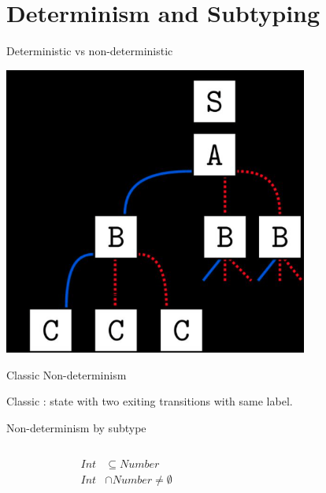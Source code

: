 \section{Determinism and Subtyping}

{  %
\begin{frame}{Deterministic vs non-deterministic}
  \centering
  
  \includegraphics[width=0.75\textwidth]{determ.png} 
\end{frame}
}

\begin{frame}{Classic Non-determinism}
  \centering
  
  \scalebox{0.95}{}

  Classic : state with two exiting transitions with same label.

\end{frame}

\begin{frame}{Non-determinism by subtype}
  \begin{columns}[T]
    \begin{column}{0.35\textwidth}
      \centering
      
      \begin{align*}
        Int&\subseteq Number\\
        Int &\cap Number \neq \emptyset
      \end{align*}%
      \scalebox{0.8}{}%
    \end{column}%
    \begin{column}{0.65\textwidth}
      \only<1>{\scalebox{0.9}{}}%
    \end{column}
  \end{columns}
\end{frame}



